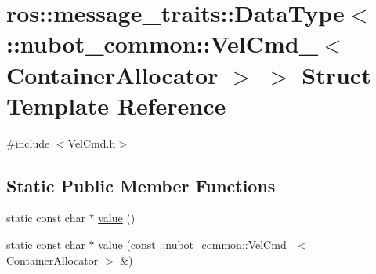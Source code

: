 \hypertarget{structros_1_1message__traits_1_1DataType_3_01_1_1nubot__common_1_1VelCmd___3_01ContainerAllocator_01_4_01_4}{\section{ros\-:\-:message\-\_\-traits\-:\-:Data\-Type$<$ \-:\-:nubot\-\_\-common\-:\-:Vel\-Cmd\-\_\-$<$ Container\-Allocator $>$ $>$ Struct Template Reference}
\label{structros_1_1message__traits_1_1DataType_3_01_1_1nubot__common_1_1VelCmd___3_01ContainerAllocator_01_4_01_4}
}


{\ttfamily \#include $<$Vel\-Cmd.\-h$>$}

\subsection*{Static Public Member Functions}
\begin{DoxyCompactItemize}
\item 
static const char $\ast$ \hyperlink{structros_1_1message__traits_1_1DataType_3_01_1_1nubot__common_1_1VelCmd___3_01ContainerAllocator_01_4_01_4_ad5423232ec4953de1ba00089a16fb1e2}{value} ()
\item 
static const char $\ast$ \hyperlink{structros_1_1message__traits_1_1DataType_3_01_1_1nubot__common_1_1VelCmd___3_01ContainerAllocator_01_4_01_4_a9b4ee0a0b035aed3fa7c0e2ca0bdcddc}{value} (const \-::\hyperlink{structnubot__common_1_1VelCmd__}{nubot\-\_\-common\-::\-Vel\-Cmd\-\_\-}$<$ Container\-Allocator $>$ \&)
\end{DoxyCompactItemize}


